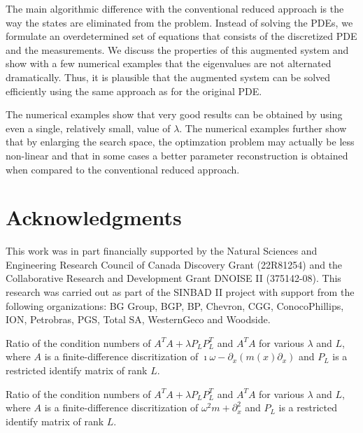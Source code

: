 \documentclass{iopart}
\begin{document}
The main algorithmic difference with the conventional reduced approach is the way the states are eliminated from the problem.
Instead of solving the PDEs, we formulate an overdetermined set of equations that consists of the discretized PDE and the measurements.
We discuss the properties of this augmented system and show with a few numerical examples that the eigenvalues are not alternated dramatically.
Thus, it is plausible that the augmented system can be solved efficiently using the same approach as for the original PDE.

The numerical examples show that
very good results can be obtained by using even a single, relatively small, value of $\lambda$.
The numerical examples further show that by enlarging the search space, the optimzation problem
may actually be less non-linear and that in some cases a better parameter reconstruction 
is obtained when compared to the conventional reduced approach.


\section*{Acknowledgments}
This work was in part financially supported by
the Natural Sciences and Engineering Research Council of Canada
Discovery Grant (22R81254) and the Collaborative Research and
Development Grant DNOISE II (375142-08). This research was carried out
as part of the SINBAD II project with support from the following
organizations: BG Group, BGP, BP, Chevron, CGG, ConocoPhillips, ION,
Petrobras, PGS, Total SA, WesternGeco and Woodside.


\clearpage

\begin{table}
\centering

\caption{Ratio of the condition numbers of $A^TA + \lambda P_LP_L^T$ and $A^TA$ for various $\lambda$ and $L$, where $A$ is a finite-difference discritization of $\imath\omega - \partial_x\left(m(x)\partial_x\right)$
and $P_L$ is a restricted identify matrix of rank $L$. }
\label{table:example2}
\end{table}

\begin{table}
\centering

\caption{Ratio of the condition numbers of $A^TA + \lambda P_LP_L^T$ and $A^TA$ for various $\lambda$ and $L$, where $A$ is a finite-difference discritization of $\omega^2 m + \partial_x^2$ and $P_L$ is a restricted identify matrix of rank $L$. }
\label{table:example3}
\end{table}
\end{document}
